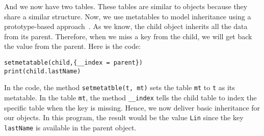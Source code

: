 And we now have two tables. These tables are similar to objects because they share a similar structure. Now, we use metatables to model inheritance using a prototype-based approach~\cite{PIJS}. As we know, the child object inherits all the data from its parent. Therefore, when we miss a key from the child, we will get back the value from the parent. Here is the code:

\begin{verbatim}
setmetatable(child,{__index = parent}) 
print(child.lastName)
\end{verbatim}

In the code, the method {\tt setmetatble(t, mt)} sets the table {\tt mt} to {\tt t} as its metatable. In the table {\tt mt}, the method {\tt \_\_index} tells the child table to index the specific table when the key is missing. Hence, we now deliver basic inheritance for our objects. In this program, the result would be the value {\tt Lin} since the key {\tt lastName} is available in the parent object.


